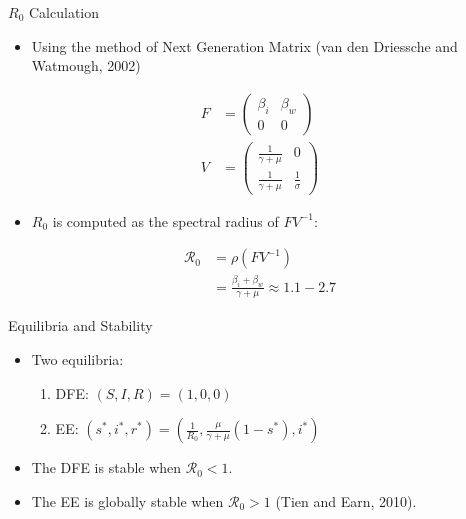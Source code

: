 \documentclass{beamer}\usepackage[]{graphicx}\usepackage[]{color}
\begin{document}
\begin{frame}[t]{$R_0$ Calculation}
\begin{itemize}
\item Using the method of Next Generation Matrix (van den Driessche and Watmough, 2002)
\end{itemize}
\begin{align*}
		F&=\begin{pmatrix}
			\beta_i & \beta_w\\
			0 & 0
			\end{pmatrix}\\
		V&=\begin{pmatrix}
			\frac{1}{\gamma+\mu} & 0\\
			\frac{1}{\gamma+\mu} &\frac{1}{\sigma}
			\end{pmatrix}
\end{align*}
\begin{itemize}
\item $R_0$ is computed as the spectral radius of $FV^{-1}$:
\end{itemize}
\begin{align*}
    {\mathcal R_0} &= \rho(FV^{-1})\\
		           &=\frac{\beta_i+\beta_w}{\gamma+\mu} \approx 1.1 - 2.7
\end{align*}
\end{frame}

\begin{frame}{Equilibria and Stability}
\begin{itemize}
\setlength\itemsep{2em}
\item Two equilibria:\\[1em]
\begin{enumerate}
\setlength\itemsep{2em}
\item DFE: $(S,I,R)=(1,0,0)$
\item EE: $(s^{*},i^{*},r^{*}) = (\frac{1}{R_0}, \frac{\mu}{\gamma+\mu}(1-s^{*}), i^{*})$
\end{enumerate}
\item The DFE is stable when ${\mathcal R_0}<1$.
\item The EE is globally stable when ${\mathcal R_0}>1$ (Tien and Earn, 2010).
\end{itemize}
\end{frame}
\end{document}
